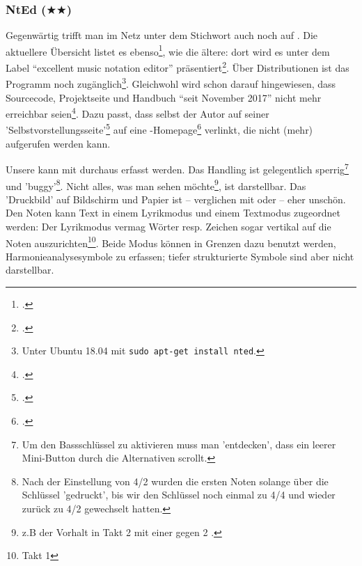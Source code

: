 %
%
%



\subsubsection{NtEd ($\bigstar$$\bigstar$)}
 
Gegenwärtig trifft man im Netz unter dem Stichwort  auch
noch auf . Die aktuellere Übersicht listet es
ebenso\footcite[vgl.][\nopage wp]{WpedNotensatz2019a}, wie die ältere: dort wird
es unter dem Label \enquote{excellent music notation editor}
präsentiert\footcite[vgl.][\nopage wp]{LinuxSoundNotation2006a}. Über
Distributionen ist das Programm noch zugänglich\footnote{Unter Ubuntu 18.04 mit
\texttt{sudo apt-get install nted}.}. Gleichwohl wird schon darauf hingewiesen,
dass Sourcecode, Projektseite und Handbuch \enquote{seit November 2017} nicht
mehr erreichbar seien\footcite[vgl.][\nopage wp]{UbuntuNtEd2016a}.
Dazu passt, dass selbst der Autor  auf seiner
'Selbstvorstellungsseite'\footcite[vgl.][\nopage wp]{Andres2018a} auf eine
-Homepage\footcite[vgl.][\nopage wp]{Andres2018b} verlinkt, die nicht
(mehr) aufgerufen werden kann.
 
Unsere  kann mit  durchaus erfasst werden. Das
Handling ist gelegentlich sperrig\footnote{Um den Bassschlüssel zu aktivieren
muss man 'entdecken', dass ein leerer Mini-Button durch die Alternativen
scrollt.} und 'buggy'\footnote{Nach der Einstellung von 4/2 wurden die ersten
Noten solange über die Schlüssel 'gedruckt', bis wir den Schlüssel noch einmal
zu 4/4 und wieder zurück zu 4/2 gewechselt hatten.}. Nicht alles, was man sehen
möchte\footnote{z.B der Vorhalt in Takt 2 mit einer \Halb gegen 2 \Vier.}, ist
darstellbar. Das 'Druckbild' auf Bildschirm und Papier ist -- verglichen mit
 oder  -- eher unschön. Den Noten kann Text in
einem Lyrikmodus und einem Textmodus zugeordnet werden: Der Lyrikmodus vermag
Wörter resp. Zeichen sogar vertikal auf die Noten auszurichten\footnote{Takt 1}.
Beide Modus können in Grenzen dazu benutzt werden, Harmonieanalysesymbole zu
erfassen; tiefer strukturierte Symbole sind aber nicht darstellbar.

